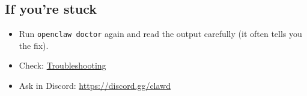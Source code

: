 \subsection{If you’re stuck}


\begin{itemize}
  \item Run \texttt{openclaw doctor} again and read the output carefully (it often tells you the fix).
  \item Check: \href{/gateway/troubleshooting}{Troubleshooting}
  \item Ask in Discord: \href{https://discord.gg/clawd}{https://discord.gg/clawd}
\end{itemize}



\clearpage
